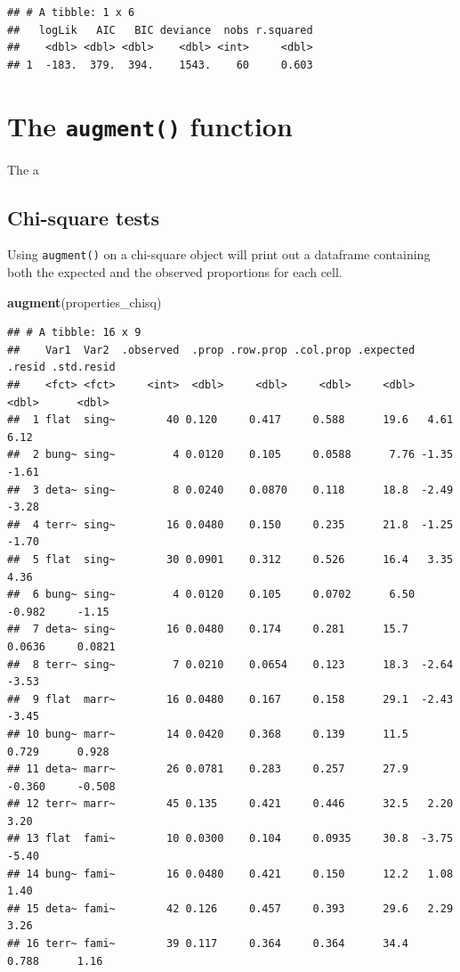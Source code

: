 \documentclass[
]{book}
\newenvironment{Shaded}{\begin{snugshade}}{\end{snugshade}}
\newcommand{\FunctionTok}[1]{\textcolor[rgb]{0.13,0.29,0.53}{\textbf{#1}}}
\newcommand{\NormalTok}[1]{#1}
\begin{document}
\begin{verbatim}
## # A tibble: 1 x 6
##   logLik   AIC   BIC deviance  nobs r.squared
##    <dbl> <dbl> <dbl>    <dbl> <int>     <dbl>
## 1  -183.  379.  394.    1543.    60     0.603
\end{verbatim}

\section{\texorpdfstring{The \texttt{augment()} function}{The augment() function}}\label{broom-augment}

The a

\subsection{Chi-square tests}\label{chi-square-tests}

Using \texttt{augment()} on a chi-square object will print out a dataframe containing both the expected and the observed proportions for each cell.

\begin{Shaded}
\begin{Highlighting}[]
\FunctionTok{augment}\NormalTok{(properties\_chisq)}
\end{Highlighting}
\end{Shaded}

\begin{verbatim}
## # A tibble: 16 x 9
##    Var1  Var2  .observed  .prop .row.prop .col.prop .expected  .resid .std.resid
##    <fct> <fct>     <int>  <dbl>     <dbl>     <dbl>     <dbl>   <dbl>      <dbl>
##  1 flat  sing~        40 0.120     0.417     0.588      19.6   4.61       6.12  
##  2 bung~ sing~         4 0.0120    0.105     0.0588      7.76 -1.35      -1.61  
##  3 deta~ sing~         8 0.0240    0.0870    0.118      18.8  -2.49      -3.28  
##  4 terr~ sing~        16 0.0480    0.150     0.235      21.8  -1.25      -1.70  
##  5 flat  sing~        30 0.0901    0.312     0.526      16.4   3.35       4.36  
##  6 bung~ sing~         4 0.0120    0.105     0.0702      6.50 -0.982     -1.15  
##  7 deta~ sing~        16 0.0480    0.174     0.281      15.7   0.0636     0.0821
##  8 terr~ sing~         7 0.0210    0.0654    0.123      18.3  -2.64      -3.53  
##  9 flat  marr~        16 0.0480    0.167     0.158      29.1  -2.43      -3.45  
## 10 bung~ marr~        14 0.0420    0.368     0.139      11.5   0.729      0.928 
## 11 deta~ marr~        26 0.0781    0.283     0.257      27.9  -0.360     -0.508 
## 12 terr~ marr~        45 0.135     0.421     0.446      32.5   2.20       3.20  
## 13 flat  fami~        10 0.0300    0.104     0.0935     30.8  -3.75      -5.40  
## 14 bung~ fami~        16 0.0480    0.421     0.150      12.2   1.08       1.40  
## 15 deta~ fami~        42 0.126     0.457     0.393      29.6   2.29       3.26  
## 16 terr~ fami~        39 0.117     0.364     0.364      34.4   0.788      1.16
\end{verbatim}
\end{document}
